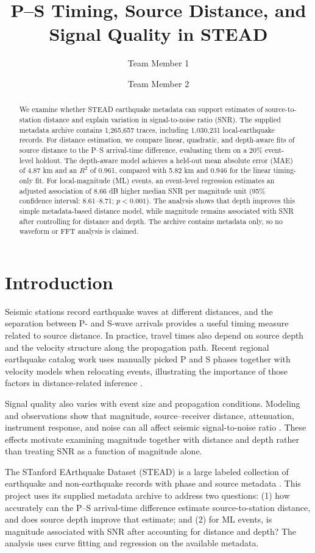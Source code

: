 \documentclass[sigconf,nonacm]{acmart}
\title{P--S Timing, Source Distance, and Signal Quality in STEAD}
\author{Team Member 1}
\affiliation{\institution{UFAZ}\country{Azerbaijan}}
\author{Team Member 2}
\affiliation{\institution{UFAZ}\country{Azerbaijan}}
\begin{document}
\begin{abstract}
We examine whether STEAD earthquake metadata can support estimates of source-to-station distance and explain variation in signal-to-noise ratio (SNR). The supplied metadata archive contains 1,265,657 traces, including 1,030,231 local-earthquake records. For distance estimation, we compare linear, quadratic, and depth-aware fits of source distance to the P--S arrival-time difference, evaluating them on a 20\% event-level holdout. The depth-aware model achieves a held-out mean absolute error (MAE) of 4.87 km and an $R^2$ of 0.961, compared with 5.82 km and 0.946 for the linear timing-only fit. For local-magnitude (ML) events, an event-level regression estimates an adjusted association of 8.66 dB higher median SNR per magnitude unit (95\% confidence interval: 8.61--8.71; $p<0.001$). The analysis shows that depth improves this simple metadata-based distance model, while magnitude remains associated with SNR after controlling for distance and depth. The archive contains metadata only, so no waveform or FFT analysis is claimed.
\end{abstract}

\maketitle

\section{Introduction}
Seismic stations record earthquake waves at different distances, and the separation between P- and S-wave arrivals provides a useful timing measure related to source distance. In practice, travel times also depend on source depth and the velocity structure along the propagation path. Recent regional earthquake catalog work uses manually picked P and S phases together with velocity models when relocating events, illustrating the importance of those factors in distance-related inference \cite{holmgren}.

Signal quality also varies with event size and propagation conditions. Modeling and observations show that magnitude, source--receiver distance, attenuation, instrument response, and noise can all affect seismic signal-to-noise ratio \cite{kwiatek}. These effects motivate examining magnitude together with distance and depth rather than treating SNR as a function of magnitude alone.

The STanford EArthquake Dataset (STEAD) is a large labeled collection of earthquake and non-earthquake records with phase and source metadata \cite{stead}. This project uses its supplied metadata archive to address two questions: (1) how accurately can the P--S arrival-time difference estimate source-to-station distance, and does source depth improve that estimate; and (2) for ML events, is magnitude associated with SNR after accounting for distance and depth? The analysis uses curve fitting and regression on the available metadata.
\end{document}
